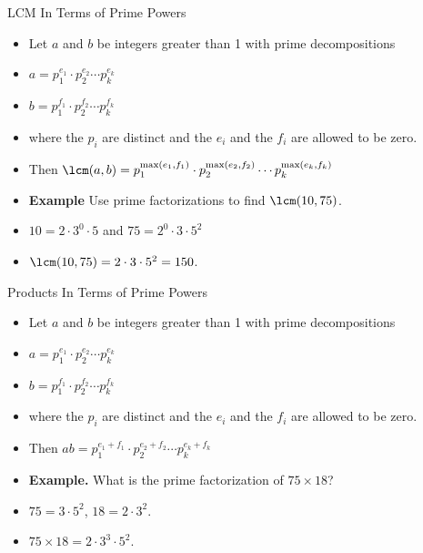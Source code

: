 \documentclass[handout]{beamer}
\begin{document}
\begin{frame}{LCM In Terms of Prime Powers}

\begin{itemize}
  \item Let $a$ and $b$ be integers greater than 1 with prime decompositions
  \item $a=p_1^{e_1} \cdot p_2^{e_2} \cdots p_k^{e_k}$
  \item $b=p_1^{f_1} \cdot p_2^{f_2} \cdots p_k^{f_k}$
  \item where the $p_i$ are distinct and the $e_i$ and the $f_i$ are allowed to be zero.
  \item Then $\lcm(a,b) = p_1^{\max(e_1,f_1)} \cdot p_2^{\max(e_2,f_2)} \cdots p_k^{\max(e_k,f_k)}$
  \item \textbf{Example} Use prime factorizations to find $\lcm(10, 75)$.
  \item $10=2\cdot 3^0 \cdot 5$ and $75 = 2^0\cdot 3 \cdot 5^2$
  \item $\lcm(10,75) = 2 \cdot 3 \cdot 5^2 = 150$.
\end{itemize}

\end{frame}

\begin{frame}{Products In Terms of Prime Powers}

\begin{itemize}
  \item Let $a$ and $b$ be integers greater than 1 with prime decompositions
  \item $a=p_1^{e_1} \cdot p_2^{e_2} \cdots p_k^{e_k}$
  \item $b=p_1^{f_1} \cdot p_2^{f_2} \cdots p_k^{f_k}$
  \item where the $p_i$ are distinct and the $e_i$ and the $f_i$ are allowed to be zero.
  \item Then $ab = p_1^{e_1+f_1} \cdot p_2^{e_2+f_2} \cdots p_k^{e_k+f_k}$
  \item \textbf{Example.} What is the prime factorization of $75 \times 18$?
  \item $75 = 3\cdot 5^2$, $18 = 2 \cdot 3^2$.
  \item $75 \times 18 = 2 \cdot 3^3 \cdot 5^2$.
\end{itemize}

\end{frame}
\end{document}

